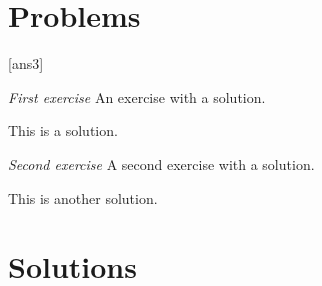 \documentclass[12pt,a4paper]{article}
\newenvironment{Ex}[1]{\begin{trivlist}\item \emph{#1} %
   \renewcommand{\Currentlabel}{#1}}{\end{trivlist}}
\begin{document}
\section*{Problems}
   [ans3]
   \begin{Ex}{First exercise}
      An exercise with a solution.
      \begin{solution}
         This is a solution.
         \relax{}
      \end{solution}
   \end{Ex}
   \begin{Ex}{Second exercise}
      A second exercise with a solution.
      \begin{solution}
         This is another solution.
      \end{solution}
   \end{Ex}
\section*{Solutions}
\end{document}
